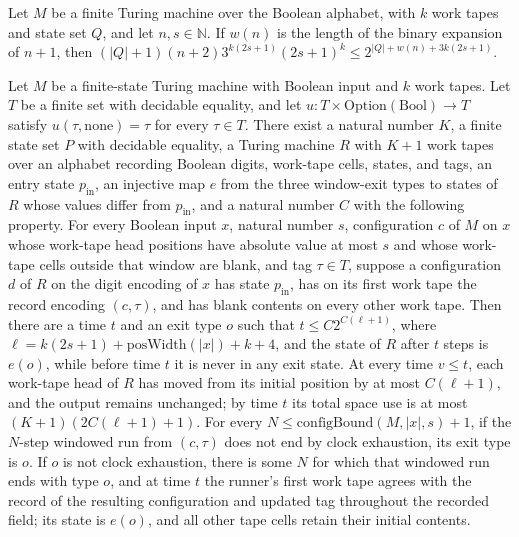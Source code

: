 \begin{theorem}
\label{Turing.FinTM.configBound_le_two_pow}
\leanok
{}
Let $M$ be a finite Turing machine over the Boolean alphabet, with $k$ work tapes and
state set $Q$, and let $n,s\in\mathbb{N}$. If $w(n)$ is the length of the binary
expansion of $n+1$, then $(|Q|+1)(n+2)3^{k(2s+1)}(2s+1)^k\le 2^{|Q|+w(n)+3k(2s+1)}$.
\end{theorem}

\begin{theorem}
\label{Turing.exists_configWindowRunnerTM}
\leanok
{}
Let $M$ be a finite-state Turing machine with Boolean input and $k$ work tapes. Let $T$
be a finite set with decidable equality, and let
$u:T\times\mathrm{Option}(\mathrm{Bool})\to T$ satisfy $u(\tau,\mathrm{none})=\tau$ for
every $\tau\in T$. There exist a natural number $K$, a finite state set $P$ with
decidable equality, a Turing machine $R$ with $K+1$ work tapes over an alphabet
recording Boolean digits, work-tape cells, states, and tags, an entry state
$p_{\mathrm{in}}$, an injective map $e$ from the three window-exit types to states of
$R$ whose values differ from $p_{\mathrm{in}}$, and a natural number $C$ with the
following property. For every Boolean input $x$, natural number $s$, configuration $c$
of $M$ on $x$ whose work-tape head positions have absolute value at most $s$ and whose
work-tape cells outside that window are blank, and tag $\tau\in T$, suppose a
configuration $d$ of $R$ on the digit encoding of $x$ has state $p_{\mathrm{in}}$, has
on its first work tape the record encoding $(c,\tau)$, and has blank contents on every
other work tape. Then there are a time $t$ and an exit type $o$ such that $t\le
C2^{C(\ell+1)}$, where $\ell=k(2s+1)+\mathrm{posWidth}(|x|)+k+4$, and the state of $R$
after $t$ steps is $e(o)$, while before time $t$ it is never in any exit state. At every
time $v\le t$, each work-tape head of $R$ has moved from its initial position by at most
$C(\ell+1)$, and the output remains unchanged; by time $t$ its total space use is at
most $(K+1)(2C(\ell+1)+1)$. For every $N\le \mathrm{configBound}(M,|x|,s)+1$, if the
$N$-step windowed run from $(c,\tau)$ does not end by clock exhaustion, its exit type is
$o$. If $o$ is not clock exhaustion, there is some $N$ for which that windowed run ends
with type $o$, and at time $t$ the runner's first work tape agrees with the record of
the resulting configuration and updated tag throughout the recorded field; its state is
$e(o)$, and all other tape cells retain their initial contents.
\end{theorem}

